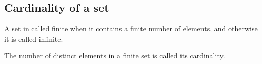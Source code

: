 


\subsection{Cardinality of a set}
A set in called finite when it contains a finite number of elements, and 
otherwise it is called infinite.

The number of distinct elements in a finite set is called its cardinality.


